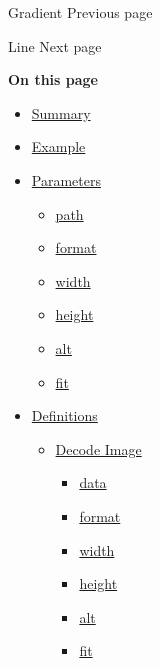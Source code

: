 \href{/docs/reference/visualize/gradient/}{\pandocbounded{}}

{ Gradient } { Previous page }

\href{/docs/reference/visualize/line/}{\pandocbounded{}}

{ Line } { Next page }

\textbf{On this page}

\begin{itemize}
\tightlist
\item
  \hyperref[summary]{Summary}
\item
  \hyperref[example]{Example}
\item
  \hyperref[parameters]{Parameters}

  \begin{itemize}
  \tightlist
  \item
    \hyperref[parameters-path]{path}
  \item
    \hyperref[parameters-format]{format}
  \item
    \hyperref[parameters-width]{width}
  \item
    \hyperref[parameters-height]{height}
  \item
    \hyperref[parameters-alt]{alt}
  \item
    \hyperref[parameters-fit]{fit}
  \end{itemize}
\item
  \hyperref[definitions]{Definitions}

  \begin{itemize}
  \tightlist
  \item
    \hyperref[definitions-decode]{Decode Image}

    \begin{itemize}
    \tightlist
    \item
      \hyperref[definitions-decode-data]{data}
    \item
      \hyperref[definitions-decode-format]{format}
    \item
      \hyperref[definitions-decode-width]{width}
    \item
      \hyperref[definitions-decode-height]{height}
    \item
      \hyperref[definitions-decode-alt]{alt}
    \item
      \hyperref[definitions-decode-fit]{fit}
    \end{itemize}
  \end{itemize}
\end{itemize}

